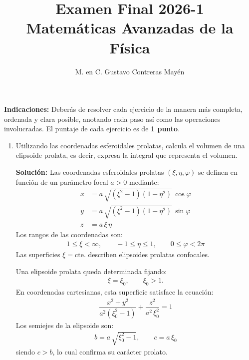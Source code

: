 \documentclass[hidelinks,12pt]{article}
\title{Examen Final 2026-1 \\[0.3em]  \large{Matemáticas Avanzadas de la Física}\vspace{-3ex}}
\author{M. en C. Gustavo Contreras Mayén}
\date{ }
\begin{document}
\vspace{-4cm}
\maketitle
\fontsize{14}{14}\selectfont

\textbf{Indicaciones: } Deberás de resolver cada ejercicio de la manera más completa, ordenada y clara posible, anotando cada paso así como las operaciones involucradas. El puntaje de cada ejercicio es de \textbf{1 punto}.

\begin{enumerate}
\item Utilizando las coordenadas esferoidales prolatas, calcula el volumen de una elipsoide prolata, es decir, expresa la integral que representa el volumen.

\noindent
\textbf{Solución:} Las coordenadas esferoidales prolatas $(\xi, \eta, \varphi)$ se definen en función de un parámetro focal $a > 0$ mediante:
\begin{align}
x &= a \, \sqrt{(\xi^{2} - 1)(1 - \eta^{2})} \, \cos \varphi \\[0.5em]
y &= a \, \sqrt{(\xi^{2} - 1)(1 - \eta^{2})} \, \sin \varphi \\[0.5em]
z &= a \, \xi \, \eta
\end{align}
Los rangos de las coordenadas son:
\begin{align*}
    1 \le \xi < \infty, \qquad -1 \le \eta \le 1, \qquad 0 \le \varphi < 2 \pi
\end{align*}
Las superficies $\xi = \text{cte.}$ describen elipsoides prolatas confocales.

Una elipsoide prolata queda determinada fijando:
\begin{align*}
    \xi = \xi_{0}, \qquad \xi_{0} > 1.
\end{align*}
En coordenadas cartesianas, esta superficie satisface la ecuación:
\begin{align*}
    \dfrac{x^{2} + y^{2}}{a^{2} (\xi_{0}^{2} - 1)} + \dfrac{z^{2}}{a^{2} \, \xi_{0}^{2}} = 1
\end{align*}
Los semiejes de la elipsoide son:
\begin{align*}
    b = a \, \sqrt{\xi_{0}^{2} - 1}, \qquad c = a \, \xi_{0}
\end{align*}
siendo $c > b$, lo cual confirma su carácter prolato.


\end{enumerate}
\end{document}
